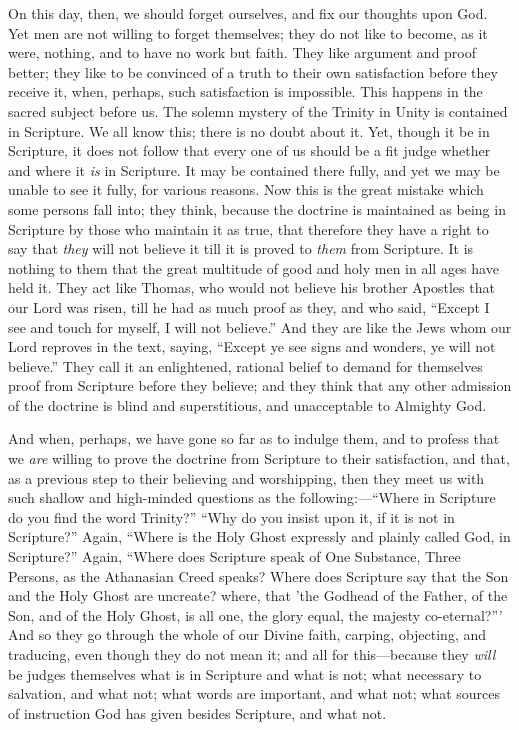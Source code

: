 On this day, then, we should forget ourselves, and fix our thoughts
upon God. Yet men are not willing to forget themselves; they do not
like to become, as it were, nothing, and to have no work but faith.
They like argument and proof better; they like to be convinced of a
truth to their own satisfaction before they receive it, when, perhaps,
such satisfaction is impossible. This happens in the sacred subject
before us. The solemn mystery of the Trinity in Unity is contained in
Scripture. We all know this; there is no doubt about it. Yet, though
it be in Scripture, it does not follow that every one of us should be
a fit judge whether and where it \emph{is} in Scripture. It may be
contained there fully, and yet we may be unable to see it fully, for
various reasons. Now this is the great mistake which some persons fall
into; they think, because the doctrine is maintained as being in
Scripture by those who maintain it as true, that therefore they have a
right to say that \emph{they} will not believe it till it is proved to
\emph{them} from Scripture. It is nothing to them that the great
multitude of good and holy men in all ages have held it. They act like
Thomas, who would not believe his brother Apostles that our Lord was
risen, till he had as much proof as they, and who said, ``Except I
see and touch for myself, I will not believe.'' And they are like
the Jews whom our Lord reproves in the text, saying, ``Except ye
see signs and wonders, ye will not believe.'' They call it an
enlightened, rational belief to demand for themselves proof from
Scripture before they believe; and they think that any other admission
of the doctrine is blind and superstitious, and unacceptable to
Almighty God.

And when, perhaps, we have gone so far as to indulge them, and to
profess that we \emph{are} willing to prove the doctrine from
Scripture to their satisfaction, and that, as a previous step to their
believing and worshipping, then they meet us with such shallow and
high-minded questions as the following:—``Where in Scripture do
you find the word Trinity?'' ``Why do you insist upon it, if
it is not in Scripture?'' Again, ``Where is the Holy Ghost
expressly and plainly called God, in Scripture?'' Again,
``Where does Scripture speak of One Substance, Three Persons, as
the Athanasian Creed speaks? Where does Scripture say that the Son and
the Holy Ghost are uncreate? where, that 'the Godhead of the Father,
of the Son, and of the Holy Ghost, is all one, the glory equal, the
majesty co-eternal?''' And so they go through the whole of our
Divine faith, carping, objecting, and traducing, even though they do
not mean it; and all for this—because they \emph{will} be judges
themselves what is in Scripture and what is not; what necessary to
salvation, and what not; what words are important, and what not; what
sources of instruction God has given besides Scripture, and what not.

